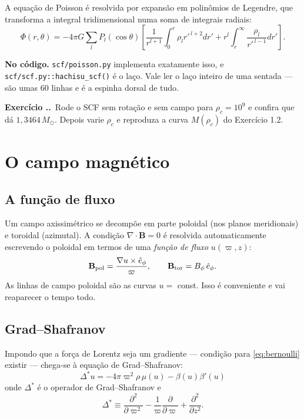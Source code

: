 \documentclass[11pt,a4paper]{article}
\newcommand{\Msun}{M_\odot}
\newcommand{\code}[1]{\texttt{\small #1}}
\newcounter{exerc}[section]
\newcommand{\ex}[1]{\refstepcounter{exerc}%
  \medskip\noindent\textbf{Exercício \thesection.\theexerc.}\ #1\medskip}
\begin{document}
A equação de Poisson é resolvida por expansão em polinômios de Legendre, que
transforma a integral tridimensional numa soma de integrais radiais:
\begin{equation}
\Phi(r,\theta) = -4\pi G\sum_{l} P_l(\cos\theta)
\left[\frac{1}{r^{l+1}}\!\int_0^r\! \rho_l r'^{\,l+2}dr'
+ r^l\!\int_r^\infty\! \frac{\rho_l}{r'^{\,l-1}}dr'\right].
\end{equation}

\begin{caixa}
\textbf{No código.} \code{scf/poisson.py} implementa exatamente isso, e
\code{scf/scf.py::hachisu\_scf()} é o laço. Vale ler o laço inteiro de uma
sentada --- são umas 60 linhas e é a espinha dorsal de tudo.
\end{caixa}

\ex{Rode o SCF sem rotação e sem campo para $\rho_c = 10^9$ e confira que dá
$1{,}3464\,\Msun$. Depois varie $\rho_c$ e reproduza a curva $M(\rho_c)$ do
Exercício 1.2.}

\section{O campo magnético}

\subsection{A função de fluxo}

Um campo axissimétrico se decompõe em parte poloidal (nos planos meridionais) e
toroidal (azimutal). A condição $\nabla\cdot\mathbf{B}=0$ é resolvida
automaticamente escrevendo o poloidal em termos de uma \emph{função de fluxo}
$u(\varpi,z)$:
\begin{equation}
\mathbf{B}_{\rm pol} = \frac{\nabla u \times \hat{e}_\phi}{\varpi},
\qquad
\mathbf{B}_{\rm tor} = B_\phi\,\hat{e}_\phi .
\end{equation}
As linhas de campo poloidal são as curvas $u = $ const. Isso é conveniente e
vai reaparecer o tempo todo.

\subsection{Grad--Shafranov}

Impondo que a força de Lorentz seja um gradiente --- condição para
\eqref{eq:bernoulli} existir --- chega-se à equação de Grad--Shafranov:
\begin{equation}
\boxed{\;\Delta^{*}u = -4\pi\varpi^2\rho\,\mu(u) - \beta(u)\beta'(u)\;}
\label{eq:gs}
\end{equation}
onde $\Delta^{*}$ é o operador de Grad--Shafranov e
\begin{equation}
\Delta^{*} \equiv \frac{\partial^2}{\partial\varpi^2}
- \frac{1}{\varpi}\frac{\partial}{\partial\varpi}
+ \frac{\partial^2}{\partial z^2}.
\end{equation}
\end{document}

